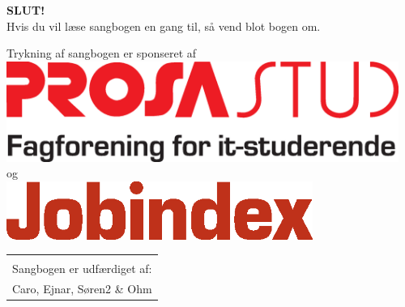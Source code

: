 \newpage

\pagecolor{ProcessBlue}

\pagestyle{empty}
\begin{center}
{\Huge \textbf{SLUT!}}\\
\vspace{4.5cm}
{\large Hvis du vil læse sangbogen en gang til, så vend blot bogen
  om.}\\

\vspace{2.5cm}

{\large Trykning af sangbogen er sponseret af \vspace{0.5cm}} \\
\includegraphics[width=0.96\textwidth]{res/prosalogo.eps} \\
\vspace{0.5cm}
og \\
\vspace{0.5cm}
\includegraphics[width=0.75\textwidth]{res/jobindex_logoKUN.eps}


\begin{tabular}{c}
\vspace{3cm}
\\
Sangbogen er udfærdiget af:\\
Caro, Ejnar, Søren2 \& Ohm
\end{tabular}
\end{center}
